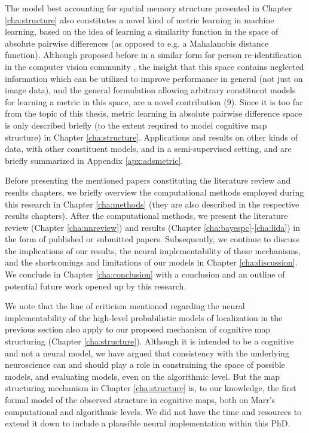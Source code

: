 The model best accounting for spatial memory structure presented in Chapter \ref{cha:structure} also constitutes a novel kind of metric learning in machine learning, based on the idea of learning a similarity function in the space of absolute pairwise differences (as opposed to e.g. a Mahalanobis distance function). Although proposed before in a similar form for person re-identification in the computer vision community \citep{zheng2011person}, the insight that this space contains neglected information which can be utilized to improve performance in general (not just on image data), and the general formulation allowing arbitrary constituent models for learning a metric in this space, are a novel contribution (9). Since it is too far from the topic of this thesis, metric learning in absolute pairwise difference space is only described briefly (to the extent required to model cognitive map structure) in Chapter \ref{cha:structure}. Applications and results on other kinds of data, with other constituent models, and in a semi-supervised setting, and are briefly summarized in Appendix \ref{apx:adsmetric}.

Before presenting the mentioned papers constituting the literature review and results chapters, we briefly overview the computational methods employed during this research in Chapter \ref{cha:methods} (they are also described in the respective results chapters). After the computational methods, we present the literature review (Chapter \ref{cha:nnreview}) and results (Chapter \ref{cha:bayespc}-\ref{cha:lida}) in the form of published or submitted papers. Subsequently, we continue to discuss the implications of our results, the neural implementability of these mechanisms, and the shortcomings and limitations of our models in Chapter \ref{cha:discussion}. We conclude in Chapter \ref{cha:conclusion} with a conclusion and an outline of potential future work opened up by this research. 

We note that the line of criticism mentioned regarding the neural implementability of the high-level probabilistic models of localization in the previous section also apply to our proposed mechanism of cognitive map structuring (Chapter \ref{cha:structure}). Although it is intended to be a cognitive and not a neural model, we have argued that consistency with the underlying neuroscience can and should play a role in constraining the space of possible models, and evaluating models, even on the algorithmic level. But the map structuring mechanism in Chapter \ref{cha:structure} is, to our knowledge, the first formal model of the observed structure in cognitive maps, both on Marr's computational and algorithmic levels. We did not have the time and resources to extend it down to include a plausible neural implementation within this PhD.

